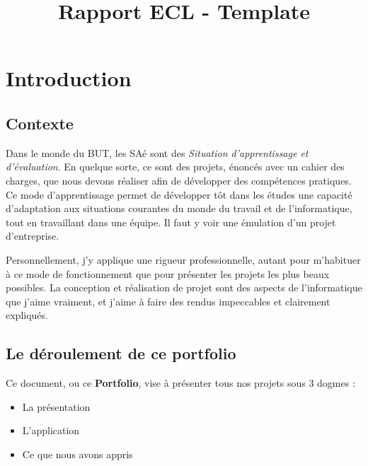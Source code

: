 \documentclass{mytex}
\title{Rapport ECL - Template} %
\begin{document}
	
	
	





\fairemarges %
\fairepagedegarde %
\tabledematieres %


\section{Introduction}

\subsection{Contexte}


Dans le monde du BUT, les SAé sont des \textit{Situation d'apprentissage et d'évaluation}.
En quelque sorte, ce sont des projets, énoncés avec un cahier des charges, que nous devons réaliser afin de développer des compétences pratiques.
Ce mode d'apprentissage permet de développer tôt dans les études une capacité d'adaptation aux situations courantes du monde du travail et de l'informatique, tout en travaillant dans une équipe.
Il faut y voir une émulation d'un projet d'entreprise.

Personnellement, j'y applique une rigueur professionnelle, autant pour m'habituer à ce mode de fonctionnement que pour présenter les projets les plus beaux possibles.
La conception et réalisation de projet sont des aspects de l'informatique que j'aime vraiment, et j'aime à faire des rendus impeccables et clairement expliqués.

\subsection{Le déroulement de ce portfolio}

Ce document, ou ce \textbf{Portfolio}, vise à présenter tous nos projets sous 3 dogmes :

\begin{itemize}
\item{La présentation}
\item{L'application}
\item{Ce que nous avons appris}
\end{itemize}
\end{document}
